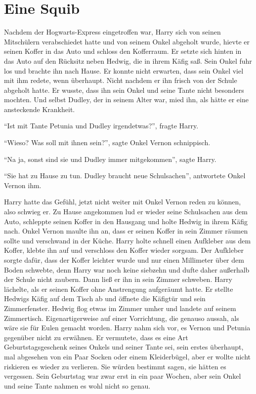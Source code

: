 \chapter{Eine Squib}


Nachdem der Hogwarts-Express eingetroffen war, Harry sich von seinen Mitschülern verabschiedet hatte und von seinem Onkel abgeholt wurde, hievte er seinen Koffer in das Auto und schloss den Kofferraum. Er setzte sich hinten in das Auto auf den Rücksitz neben Hedwig, die in ihrem Käfig saß. Sein Onkel fuhr los und brachte ihn nach Hause. Er konnte nicht erwarten, dass sein Onkel viel mit ihm redete, wenn überhaupt. Nicht nachdem er ihn frisch von der Schule abgeholt hatte. Er wusste, dass ihn sein Onkel und seine Tante nicht besonders mochten. Und selbst Dudley, der in seinem Alter war, mied ihn, als hätte er eine ansteckende Krankheit.

\enquote{Ist mit Tante Petunia und Dudley irgendetwas?}, fragte Harry.

\enquote{Wieso? Was soll mit ihnen sein?}, sagte Onkel Vernon schnippisch. 

\enquote{Na ja, sonst sind sie und Dudley immer mitgekommen}, sagte Harry.

\enquote{Sie hat zu Hause zu tun. Dudley braucht neue Schulsachen}, antwortete Onkel Vernon ihm.

Harry hatte das Gefühl, jetzt nicht weiter mit Onkel Vernon reden zu können, also schwieg er. Zu Hause angekommen lud er wieder seine Schulsachen aus dem Auto, schleppte seinen Koffer in den Hausgang und holte Hedwig in ihrem Käfig nach. Onkel Vernon maulte ihn an, dass er seinen Koffer in sein Zimmer räumen sollte und verschwand in der Küche. Harry holte schnell einen Aufkleber aus dem Koffer, klebte ihn auf und verschloss den Koffer wieder sorgsam. Der Aufkleber sorgte dafür, dass der Koffer leichter wurde und nur einen Millimeter über dem Boden schwebte, denn Harry war noch keine siebzehn und dufte daher außerhalb der Schule nicht zaubern. Dann ließ er ihn in sein Zimmer schweben. Harry lächelte, als er seinen Koffer ohne Anstrengung aufgeräumt hatte. Er stellte Hedwigs Käfig auf dem Tisch ab und öffnete die Käfigtür und sein Zimmerfenster. Hedwig flog etwas im Zimmer umher und landete auf seinem Zimmertisch. Eigenartigerweise auf einer Vorrichtung, die genauso aussah, als wäre sie für Eulen gemacht worden. Harry nahm sich vor, es Vernon und Petunia gegenüber nicht zu erwähnen. Er vermutete, dass es eine Art Geburtstagsgeschenk seines Onkels und seiner Tante sei, sein erstes überhaupt, mal abgesehen von ein Paar Socken oder einem Kleiderbügel, aber er wollte nicht riskieren es wieder zu verlieren. Sie würden bestimmt sagen, sie hätten es vergessen. Sein Geburtstag war zwar erst in ein paar Wochen, aber sein Onkel und seine Tante nahmen es wohl nicht so genau.

